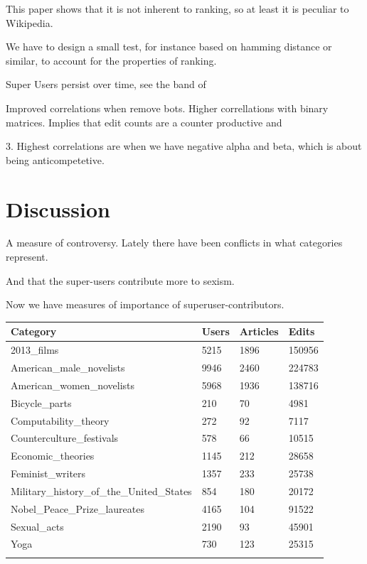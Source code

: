 \documentclass{acm_proc_article-sp}
\begin{document}
This paper \cite{bloom} shows that it is not inherent to ranking, so at least it is peculiar to Wikipedia. 

We have to design a small test, for instance based on hamming distance or similar, to account for the properties of ranking. 


Super Users persist over time, see the band of 




Improved correlations when remove bots. Higher correllations with binary matrices. 
Implies that edit counts are a counter productive and 


3. Highest correlations are when we have negative alpha and beta, which is about being anticompetetive. 




\section{Discussion}

A measure of controversy. Lately there have been conflicts in what categories represent.  \cite{website:nyt}

And that the super-users contribute more to sexism.\cite{website:wikinewsreporter}

 Now we have measures of importance of superuser-contributors. 


\begin{tabular}{llll}
\toprule
Category & Users & Articles &  Edits \\
\midrule
2013\_films &  5215 &     1896 &  150956 \\
American\_male\_novelists &  9946 &     2460 &  224783 \\
American\_women\_novelists &  5968 &     1936 &  138716 \\
Bicycle\_parts &   210 &       70 &    4981 \\
Computability\_theory &   272 &       92 &    7117 \\
Counterculture\_festivals &   578 &       66 &   10515 \\
Economic\_theories &  1145 &      212 &   28658 \\
Feminist\_writers &  1357 &      233 &   25738 \\
Military\_history\_of\_the\_United\_States &   854 &      180 &   20172 \\
Nobel\_Peace\_Prize\_laureates &  4165 &      104 &   91522 \\
Sexual\_acts &  2190 &       93 &   45901 \\
Yoga &   730 &      123 &   25315 \\
\bottomrule
\label{tab:statistics}
\end{tabular}
\end{document}
